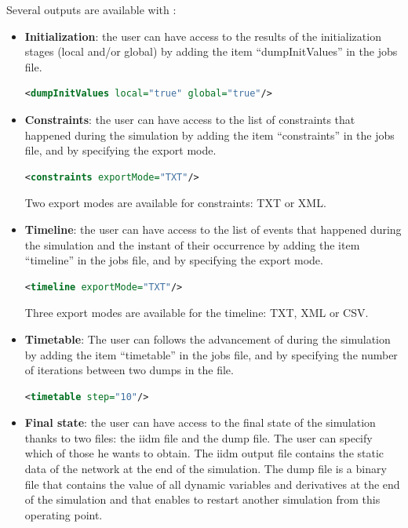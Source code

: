 \documentclass[a4paper, 12pt]{report}
\begin{document}
Several outputs are available with \Dynawo:
\begin{itemize}
\item \textbf{Initialization}: the user can have access to the results of the initialization stages (local and/or global) by adding the item ``dumpInitValues'' in the jobs file.

\begin{lstlisting}[language=XML, morekeywords={dumpInitValues},numbers=none]
<dumpInitValues local="true" global="true"/>
\end{lstlisting}

\item \textbf{Constraints}: the user can have access to the list of constraints that happened during the simulation by adding the item ``constraints'' in the jobs file, and by specifying the export mode.
\begin{lstlisting}[language=XML, morekeywords={constraints},numbers=none]
<constraints exportMode="TXT"/>
\end{lstlisting}
Two export modes are available for constraints: TXT or XML.

\item \textbf{Timeline}: the user can have access to the list of events that happened during the simulation and the instant of their occurrence by adding the item ``timeline'' in the jobs file, and by specifying the export mode.

\begin{lstlisting}[language=XML, morekeywords={timeline},numbers=none]
<timeline exportMode="TXT"/>
\end{lstlisting}
Three export modes are available for the timeline: TXT, XML or CSV.

\item \textbf{Timetable}: The user can follows the advancement of \Dynawo during the simulation by adding the item ``timetable'' in the jobs file, and by specifying the number of iterations between two dumps in the file.

\begin{lstlisting}[language=XML, morekeywords={timeline},numbers=none]
<timetable step="10"/>
\end{lstlisting}

\item \textbf{Final state}: the user can have access to the final state of the simulation thanks to two files: the iidm file and the dump file. The user can specify which of those he wants to obtain. The iidm output file contains the static data of the network at the end of the simulation. The dump file is a binary file that contains the value of all dynamic variables and derivatives at the end of the simulation and that enables to restart another simulation from this operating point.


\end{itemize}
\end{document}
